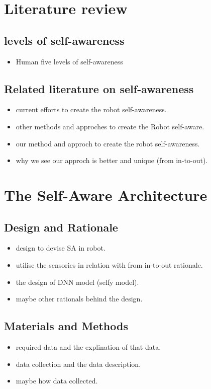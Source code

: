 \documentclass[12pt]{article}
\begin{document}
\section{Literature review}
\subsection{levels of self-awareness}
\begin{itemize}
\item Human five levels of self-awareness
\end{itemize}
\subsection{Related literature on self-awareness}
\begin{itemize}
\item current efforts to create the robot self-awareness.
\item other methods and approches to create the Robot self-aware.
\item our method and approch to create the robot self-awareness.
\item why we see our approch is better and unique (from in-to-out).
\end{itemize}

\section{The Self-Aware Architecture}
\subsection{Design and Rationale}
\begin{itemize}
\item design to devise SA in robot.
\item utilise the sensories in relation with from in-to-out rationale.
\item the design of DNN model (selfy model). 
\item maybe other rationals behind the design.
\end{itemize}
\subsection{Materials and Methods}
\begin{itemize}
\item required data and the explination of that data.
\item data collection and the data description.
\item maybe how data collected.
\end{itemize}
\end{document}
